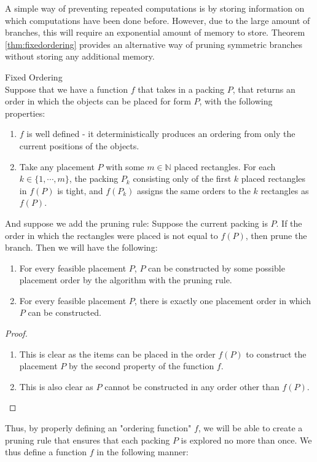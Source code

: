 \documentclass{article}
\begin{document}
A simple way of preventing repeated computations is by storing information on which computations have been done before. However, due to the large amount of branches, this will require an exponential amount of memory to store. Theorem \ref{thm:fixedordering} provides an alternative way of pruning symmetric branches without storing any additional memory.

\begin{thm} Fixed Ordering\\
\label{thm:fixedordering}
Suppose that we have a function $f$ that takes in a packing $P$, that returns an order in which the objects can be placed for form $P$, with the following properties:
  \begin{enumerate}
  \item $f$ is well defined - it deterministically produces an ordering from only the current positions of the objects.
  \item Take any placement $P$ with some $m \in \mathbb{N}$ placed rectangles. For each $k \in \{1,\cdots,m\}$, the packing $P_k$ consisting only of the first $k$ placed rectangles in $f(P)$ is tight, and $f(P_k)$ assigns the same orders to the $k$ rectangles as $f(P)$.
  \end{enumerate}
And suppose we add the pruning rule: Suppose the current packing is $P$. If the order in which the rectangles were placed is not equal to $f(P)$, then prune the branch.
Then we will have the following:
  \begin{enumerate}
  \item For every feasible placement $P$, $P$ can be constructed by some possible placement order by the algorithm with the pruning rule.
  \item For every feasible placement $P$, there is exactly one placement order in which $P$ can be constructed.
  \end{enumerate}
\end{thm}
\begin{proof}~\\
\begin{enumerate}
\item
This is clear as the items can be placed in the order $f(P)$ to construct the placement $P$ by the second property of the function $f$.
\item
This is also clear as $P$ cannot be constructed in any order other than $f(P)$.
\end{enumerate}
\end{proof}

Thus, by properly defining an "ordering function" $f$, we will be able to create a pruning rule that ensures that each packing $P$ is explored no more than once. We thus define a function $f$ in the following manner:\\
\end{document}
